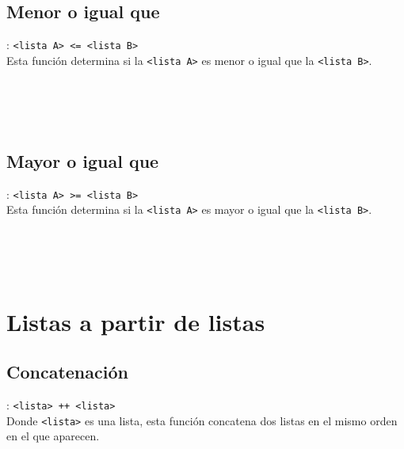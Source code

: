       \subsection*{Menor o igual que}: \texttt{<lista A>~\texttt{<=}~<lista B>}\\
      Esta función determina si la \texttt{<lista A>} es menor o igual que la \texttt{<lista B>}.
      
      \begin{fxcode}
         \arrowcode{[1, 2] <= [3, 4]}\\
         \\
         \arrowcode{[1, 2, 1] <= [1, 2, 1]}\\
      \end{fxcode}
      
      \subsection*{Mayor o igual que}: \texttt{<lista A>~\texttt{>=}~<lista B>}\\
      Esta función determina si la \texttt{<lista A>} es mayor o igual que la \texttt{<lista B>}.
      
      \begin{fxcode}
         \arrowcode{[1, 2] >= [3, 4]}\\
         \\
         \arrowcode{[1, 2, 1] >= [1, 2, 1]}\\
      \end{fxcode}
      
   \section{Listas a partir de listas}
      
      \subsection*{Concatenación}: \texttt{<lista>~++~<lista>}\\
      Donde \texttt{<lista>} es una lista, esta función concatena dos listas en el mismo orden en el que aparecen.
      
      \begin{fxcode}
         \\
      \end{fxcode}
      
